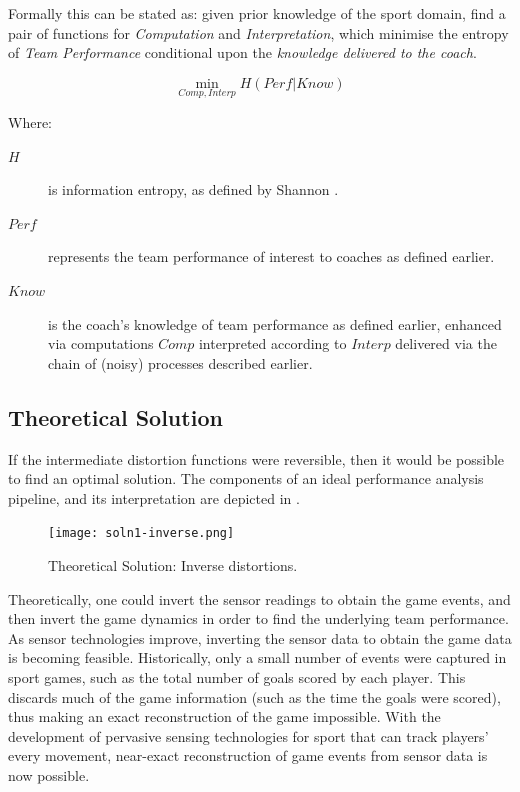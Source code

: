 Formally this can be stated as: given prior knowledge of the sport domain,
find a pair of functions for \emph{Computation} and \emph{Interpretation}, which minimise the entropy of \emph{Team Performance} conditional upon the \emph{knowledge delivered
to the coach}.

\[\min_{Comp, Interp} H(Perf|Know)\]

\begin{minipage}{1.0\textwidth}
Where:
\begin{description}
    \item[$H$] is information entropy, as defined by Shannon \cite{Shannon1948}.
    \item[$Perf$] represents the team performance of interest to coaches as defined earlier.
    \item[$Know$] is the coach's knowledge of team performance as defined earlier, enhanced via computations $Comp$ interpreted according to $Interp$ delivered via the chain of (noisy) processes described earlier.
\end{description}
\end{minipage}


\subsection{Theoretical Solution}\label{heuristic-solution-1}

If the intermediate distortion functions were reversible, then it would be possible to
find an optimal solution. The components of an ideal performance analysis pipeline, and its interpretation are depicted in .

\begin{figure}[htbp]
\centering
\texttt{[image: soln1-inverse.png]}
\caption{Theoretical Solution: Inverse distortions. \label{fig:soln1-inverse}}
\end{figure}

Theoretically, one could invert the sensor readings to obtain the game events, and
then invert the game dynamics in order to find the underlying team
performance. As sensor technologies improve, inverting the sensor data
to obtain the game data is becoming feasible. Historically, only a small
number of events were captured in sport games, such as the total number
of goals scored by each player. This discards much of the game
information (such as the time the goals were scored), thus making an
exact reconstruction of the game impossible. With the development of
pervasive sensing technologies for sport that can track players' every movement, near-exact reconstruction of game events from sensor data is now possible.

